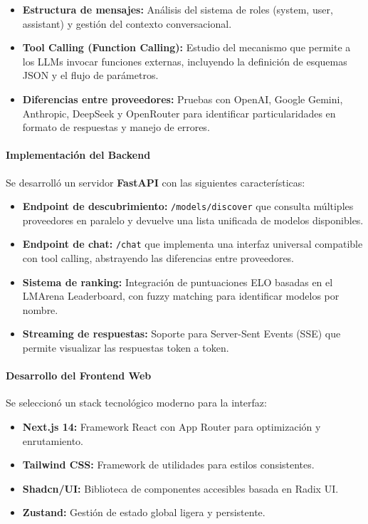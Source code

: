 \documentclass[12pt,a4paper]{article}
\begin{document}
\begin{itemize}
    \item \textbf{Estructura de mensajes:} Análisis del sistema de roles (system, user, assistant) y gestión del contexto conversacional.
    \item \textbf{Tool Calling (Function Calling):} Estudio del mecanismo que permite a los LLMs invocar funciones externas, incluyendo la definición de esquemas JSON y el flujo de parámetros.
    \item \textbf{Diferencias entre proveedores:} Pruebas con OpenAI, Google Gemini, Anthropic, DeepSeek y OpenRouter para identificar particularidades en formato de respuestas y manejo de errores.
\end{itemize}

\paragraph{Implementación del Backend}

Se desarrolló un servidor \textbf{FastAPI} con las siguientes características:

\begin{itemize}
    \item \textbf{Endpoint de descubrimiento:} \texttt{/models/discover} que consulta múltiples proveedores en paralelo y devuelve una lista unificada de modelos disponibles.
    \item \textbf{Endpoint de chat:} \texttt{/chat} que implementa una interfaz universal compatible con tool calling, abstrayendo las diferencias entre proveedores.
    \item \textbf{Sistema de ranking:} Integración de puntuaciones ELO basadas en el LMArena Leaderboard, con fuzzy matching para identificar modelos por nombre.
    \item \textbf{Streaming de respuestas:} Soporte para Server-Sent Events (SSE) que permite visualizar las respuestas token a token.
\end{itemize}

\paragraph{Desarrollo del Frontend Web}

Se seleccionó un stack tecnológico moderno para la interfaz:

\begin{itemize}
    \item \textbf{Next.js 14:} Framework React con App Router para optimización y enrutamiento.
    \item \textbf{Tailwind CSS:} Framework de utilidades para estilos consistentes.
    \item \textbf{Shadcn/UI:} Biblioteca de componentes accesibles basada en Radix UI.
    \item \textbf{Zustand:} Gestión de estado global ligera y persistente.
\end{itemize}
\end{document}
